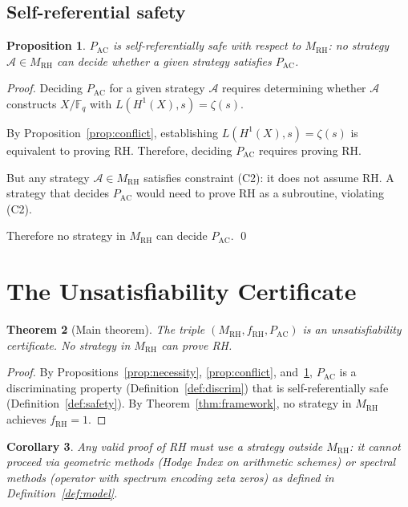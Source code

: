 \documentclass[12pt]{article}
\newtheorem{theorem}{Theorem}[section]
\newtheorem{proposition}[theorem]{Proposition}
\newtheorem{corollary}[theorem]{Corollary}
\newcommand{\FF}{\mathbb{F}}
\newcommand{\MRH}{M_{\mathrm{RH}}}
\newcommand{\PAC}{P_{\mathrm{AC}}}
\begin{document}
\subsection{Self-referential safety}

\begin{proposition}
\label{prop:safety}
$\PAC$ is self-referentially safe with respect to $\MRH$: no strategy
$\mathcal{A} \in \MRH$ can decide whether a given strategy satisfies
$\PAC$.
\end{proposition}

\begin{proof}
Deciding $\PAC$ for a given strategy $\mathcal{A}$ requires determining
whether $\mathcal{A}$ constructs $X/\FF_q$ with $L(H^1(X),s) = \zeta(s)$.

By Proposition~\ref{prop:conflict}, establishing $L(H^1(X),s) = \zeta(s)$
is equivalent to proving RH. Therefore, deciding $\PAC$ requires proving
RH.

But any strategy $\mathcal{A} \in \MRH$ satisfies constraint (C2): it
does not assume RH. A strategy that decides $\PAC$ would need to prove
RH as a subroutine, violating (C2).

Therefore no strategy in $\MRH$ can decide $\PAC$. \qed
\end{proof}

\section{The Unsatisfiability Certificate}
\label{sec:cert}

\begin{theorem}[Main theorem]
\label{thm:main}
The triple $(\MRH, f_{\mathrm{RH}}, \PAC)$ is an unsatisfiability
certificate. No strategy in $\MRH$ can prove RH.
\end{theorem}

\begin{proof}
By Propositions~\ref{prop:necessity}, \ref{prop:conflict},
and~\ref{prop:safety}, $\PAC$ is a discriminating property
(Definition~\ref{def:discrim}) that is self-referentially safe
(Definition~\ref{def:safety}). By Theorem~\ref{thm:framework},
no strategy in $\MRH$ achieves $f_{\mathrm{RH}} = 1$.
\end{proof}

\begin{corollary}
Any valid proof of RH must use a strategy outside $\MRH$: it cannot
proceed via geometric methods (Hodge Index on arithmetic schemes) or
spectral methods (operator with spectrum encoding zeta zeros) as
defined in Definition~\ref{def:model}.
\end{corollary}
\end{document}
